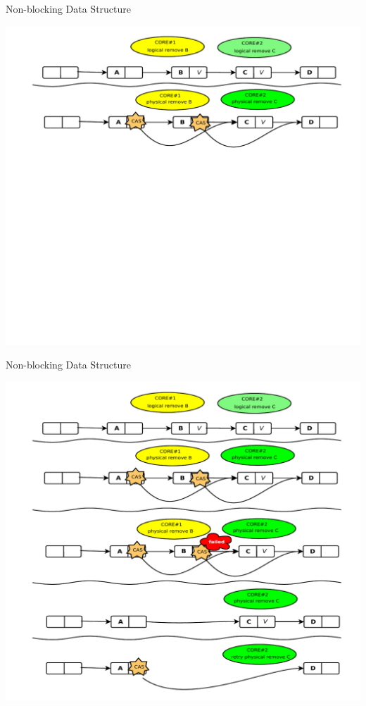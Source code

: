 \documentclass[english]{beamer} %
\begin{document}
\begin{frame}{Non-blocking Data Structure}
\begin{center}
\includegraphics[scale=0.4]{fig/harris_1}
\end{center}
\end{frame}

\begin{frame}{Non-blocking Data Structure}
\begin{center}
\includegraphics[scale=0.4]{fig/harris_2}
\end{center}
\end{frame}
\end{document}
